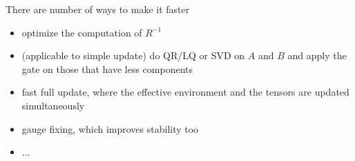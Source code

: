         There are number of ways to make it faster
        \begin{itemize}
            \item optimize the computation of $R^{-1}$
            \item (applicable to simple update) do QR/LQ or SVD on $A$ and $B$ and apply the gate on those that have less components
            \item fast full update, where the effective environment and the tensors are updated simultaneously
            \item gauge fixing, which improves stability too
            \item ...
        \end{itemize}
